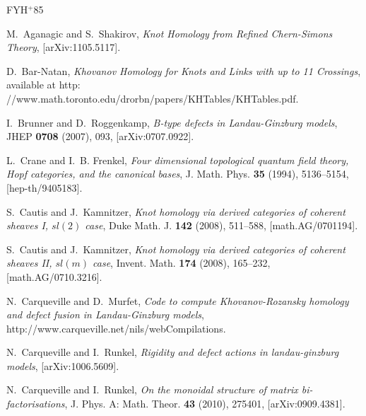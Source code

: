 \documentclass{compositio}
\theoremstyle{definition}
\numberwithin{equation}{section}
\begin{document}
%
%


\newcommand{\etalchar}[1]{$^{#1}$}
\providecommand{\href}[2]{#2}
\begin{thebibliography}{FYH{\etalchar{+}}85}

M.~Aganagic and S.~Shakirov, \emph{Knot {H}omology from {R}efined
  {C}hern-{S}imons {T}heory},
  \href{http://arxiv.org/abs/1105.5117}{[arXiv:1105.5117]}.

D.~Bar-Natan, \emph{Khovanov {H}omology for {K}nots and {L}inks with up to 11
  {C}rossings}, available at
  \href{http://www.math.toronto.edu/drorbn/papers/KHTables/KHTables.pdf}{http:%
//www.math.toronto.edu/drorbn/papers/KHTables/KHTables.pdf}.

I.~Brunner and D.~Roggenkamp, \emph{B-type defects in {L}andau-{G}inzburg
  models}, JHEP \textbf{0708} (2007), 093,
  \href{http://arxiv.org/abs/0707.0922}{[arXiv:0707.0922]}.

L.~Crane and I.~B. Frenkel, \emph{Four dimensional topological quantum field
  theory, {H}opf categories, and the canonical bases}, J. Math. Phys.
  \textbf{35} (1994), 5136--5154,
  \href{http://arxiv.org/abs/hep-th/9405183}{[hep-th/9405183]}.

S.~Cautis and J.~Kamnitzer, \emph{Knot homology via derived categories of
  coherent sheaves {I}, {$sl(2)$} case}, Duke Math. J. \textbf{142} (2008),
  511--588, \href{http://arxiv.org/abs/math/0701194}{[math.AG/0701194]}.

S.~Cautis and J.~Kamnitzer, \emph{Knot homology via derived categories of coherent sheaves {II},
  {$sl(m)$} case}, Invent. Math. \textbf{174} (2008), 165--232,
  \href{http://arxiv.org/abs/math/0710.3216}{[math.AG/0710.3216]}.

N.~Carqueville and D.~Murfet, \emph{Code to compute {K}hovanov-{R}ozansky
  homology and defect fusion in {L}andau-{G}inzburg models},
  \href{http://www.carqueville.net/nils/webCompilations}{http://www.carqueville.net/nils/webCompilations}.

N.~Carqueville and I.~Runkel, \emph{Rigidity and defect actions in
  landau-ginzburg models},
  \href{http://arxiv.org/abs/1006.5609}{[arXiv:1006.5609]}.

N.~Carqueville and I.~Runkel, \emph{On the monoidal structure of matrix bi-factorisations}, J. Phys.
  A: Math. Theor. \textbf{43} (2010), 275401,
  \href{http://arxiv.org/abs/0909.4381}{[arXiv:0909.4381]}.


\end{thebibliography}
\end{document}
